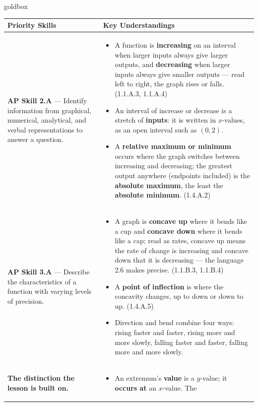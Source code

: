 \documentclass[10pt]{article}
\begin{document}
\renewcommand{\arraystretch}{1.6}
\begin{skillbox}{goldbox}
\begin{tabularx}{\linewidth}{@{}X X@{}}
\textbf{Priority Skills} &
\textbf{Key Understandings} \\
\midrule
\textbf{AP Skill 2.A} --- Identify information from graphical, numerical, analytical, and
verbal representations to answer a question. &
\begin{itemize}[leftmargin=1.2em,itemsep=2pt,topsep=0pt]
  \item A function is \textbf{increasing} on an interval when larger inputs always give larger
        outputs, and \textbf{decreasing} when larger inputs always give smaller outputs ---
        read left to right, the graph rises or falls. (1.1.A.3, 1.1.A.4)
  \item An interval of increase or decrease is a stretch of \textbf{inputs}: it is written
        in $x$-values, as an open interval such as $(0, 2)$.
  \item A \textbf{relative maximum or minimum} occurs where the graph switches between
        increasing and decreasing; the greatest output anywhere (endpoints included) is the
        \textbf{absolute maximum}, the least the \textbf{absolute minimum}. (1.4.A.2)
\end{itemize} \\
\textbf{AP Skill 3.A} --- Describe the characteristics of a function with varying levels of
precision. &
\begin{itemize}[leftmargin=1.2em,itemsep=2pt,topsep=0pt]
  \item A graph is \textbf{concave up} where it bends like a cup and \textbf{concave down}
        where it bends like a cap; read as rates, concave up means the rate of change is
        increasing and concave down that it is decreasing --- the language 2.6 makes
        precise. (1.1.B.3, 1.1.B.4)
  \item A \textbf{point of inflection} is where the concavity changes, up to down or down to
        up. (1.4.A.5)
  \item Direction and bend combine four ways: rising faster and faster, rising more and more
        slowly, falling faster and faster, falling more and more slowly.
\end{itemize} \\
\textbf{The distinction the lesson is built on.} &
\begin{itemize}[leftmargin=1.2em,itemsep=2pt,topsep=0pt]
  \item An extremum's \textbf{value} is a $y$-value; it \textbf{occurs at} an $x$-value. The

\end{itemize}
\end{tabularx}
\end{skillbox}
\end{document}

